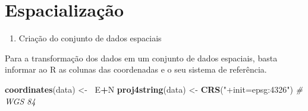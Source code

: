 \documentclass[]{article}
\newenvironment{Shaded}{\begin{snugshade}}{\end{snugshade}}
\newcommand{\KeywordTok}[1]{\textcolor[rgb]{0.13,0.29,0.53}{\textbf{#1}}}
\newcommand{\StringTok}[1]{\textcolor[rgb]{0.31,0.60,0.02}{#1}}
\newcommand{\CommentTok}[1]{\textcolor[rgb]{0.56,0.35,0.01}{\textit{#1}}}
\newcommand{\OperatorTok}[1]{\textcolor[rgb]{0.81,0.36,0.00}{\textbf{#1}}}
\newcommand{\ErrorTok}[1]{\textcolor[rgb]{0.64,0.00,0.00}{\textbf{#1}}}
\newcommand{\NormalTok}[1]{#1}
\providecommand{\tightlist}{%
  \setlength{\itemsep}{0pt}\setlength{\parskip}{0pt}}
\let\proglang=\textsf
\begin{document}
\section{Espacialização}\label{espacializacao}

\begin{enumerate}
\def\labelenumi{\alph{enumi}.}
\tightlist
\item
  Criação do conjunto de dados espaciais
\end{enumerate}

Para a transformação dos dados em um conjunto de dados espaciais, basta
informar ao \proglang{R} as colunas das coordenadas e o seu sistema de
referência.

\begin{Shaded}
\begin{Highlighting}[]
\KeywordTok{coordinates}\NormalTok{(data) <-}\StringTok{ }\ErrorTok{~}\NormalTok{E}\OperatorTok{+}\NormalTok{N}
\KeywordTok{proj4string}\NormalTok{(data) <-}\StringTok{ }\KeywordTok{CRS}\NormalTok{(}\StringTok{"+init=epsg:4326"}\NormalTok{) }\CommentTok{# WGS 84}
\end{Highlighting}
\end{Shaded}
\end{document}

